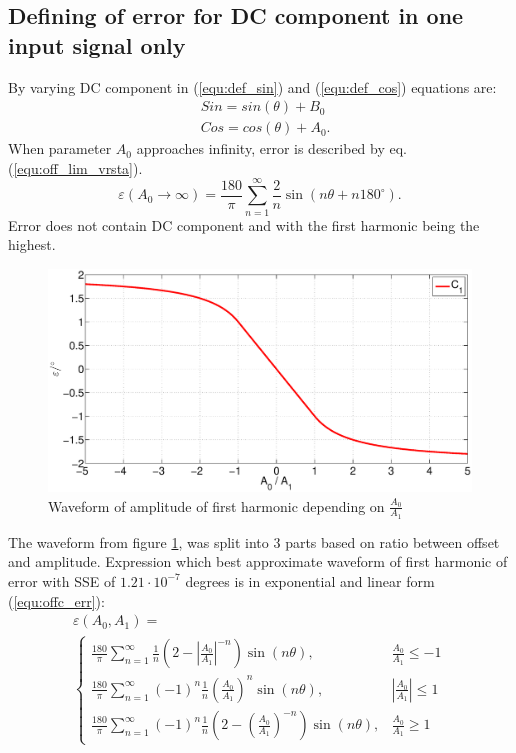 \documentclass[a4paper]{article}
\begin{document}
\subsection{Defining of error for DC component in one input signal only}
\label{DCoff}
By varying DC component in (\ref{equ:def_sin}) and (\ref{equ:def_cos}) equations are:
\begin{eqnarray}
&Sin = sin(\theta)+ B_0\\
&Cos = cos(\theta) + A_0.
\end{eqnarray}
When parameter $A_0$ approaches infinity, error is described by eq. (\ref{equ:off_lim_vrsta}).
\begin{equation}
\label{equ:off_lim_vrsta}
\varepsilon (A_0 \rightarrow \infty) = \frac{180}{\pi}\sum_{n=1}^{\infty}\frac{2}{n} \sin (n \theta + n 180^\circ).
\end{equation}
Error does not contain DC component and with the first harmonic being the highest.
\begin{figure}[!htb]
	\begin{center}
		\includegraphics[width=\linewidth]{./Slike/off.eps}
		\caption{Waveform of amplitude of first harmonic depending on  $\frac{A_0}{A_1}$} \label{fig:off}
	\end{center}
\end{figure}
The waveform from figure \ref{fig:off}, was split into 3 parts based on ratio between offset and amplitude. Expression which best approximate waveform of first harmonic of error with SSE of $1.21 \cdot 10^{-7}$ degrees is in exponential and linear form (\ref{equ:offc_err}):
\begin{multline}
\label{equ:offc_err}
\varepsilon(A_0, A_1)=\\
\begin{cases}
\frac{180}{\pi}\sum_{n=1}^{\infty} \frac{1}{n}(2-|\frac{A_0}{A_1}|^{-n}) \sin (n \theta ), & \frac{A_0}{A_1}\leq -1 \\
\frac{180}{\pi}\sum_{n=1}^{\infty}(-1)^n\frac{1}{n}(\frac{A_0}{A_1})^n \sin (n \theta ), & |\frac{A_0}{A_1}|\leq 1 \\
\frac{180}{\pi}\sum_{n=1}^{\infty}(-1)^n\frac{1}{n}(2-(\frac{A_0}{A_1})^{-n}) \sin (n \theta ), & \frac{A_0}{A_1}\geq 1
\end{cases}
\end{multline}
\end{document}

